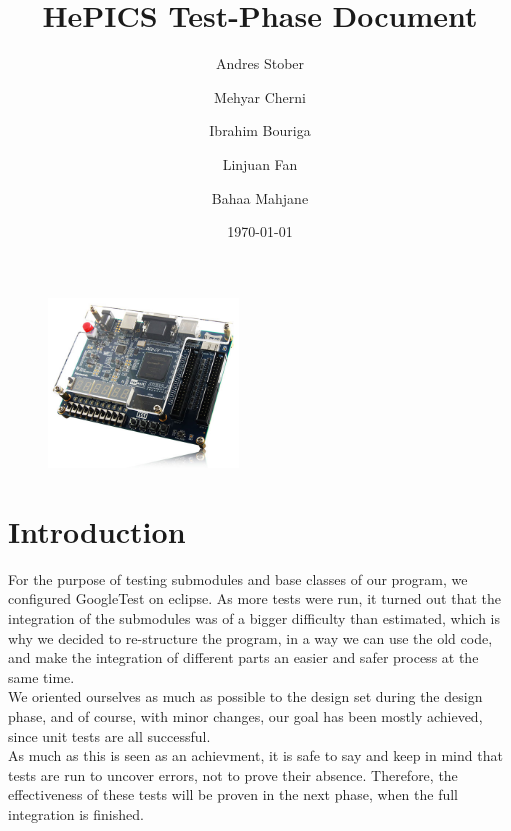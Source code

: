 \documentclass[parskip=full]{scrartcl}
\title{\Huge \textbf{HePICS Test-Phase Document}}
\date{\today \vspace{+10ex}}
\author{Andres Stober \\
	\and Mehyar Cherni \\
	\and Ibrahim Bouriga \\ 
	\and Linjuan Fan \\
	\and Bahaa Mahjane \\ }
\begin{document}
\maketitle
\thispagestyle{empty}


\begin{figure}[b]
\centering
\includegraphics[width=0.45\textwidth, center]{boardimage}
\end{figure}

\pagebreak

\tableofcontents
\thispagestyle{empty}
\pagebreak



\section {Introduction}
For the purpose of testing submodules and base classes of our program, we configured GoogleTest on eclipse. As more tests were run, it turned out that the integration of the submodules was of a bigger difficulty than estimated, which is why we decided to re-structure the program, in a way we can use the old code, and make the integration of different parts an easier and safer process at the same time.\\
We oriented ourselves as much as possible to the design set during the design phase, and of course, with minor changes, our goal has been mostly achieved, since unit tests are all successful.\\
As much as this is seen as an achievment, it is safe to say and keep in mind that tests are run to uncover errors, not to prove their absence. Therefore, the effectiveness of these tests will be proven in the next phase, when the full integration is finished.
\end{document}
